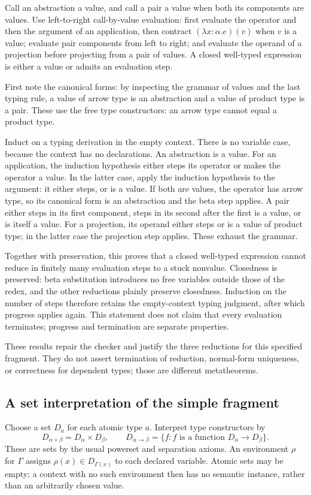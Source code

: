 \begin{theorem}
Call an abstraction a value, and call a pair a value when both its
components are values. Use left-to-right call-by-value evaluation:
first evaluate the operator and then the argument of an application,
then contract $(\lambda x:\alpha.e)(v)$ when $v$ is a value;
evaluate pair components from left to right; and evaluate the operand
of a projection before projecting from a pair of values. A closed
well-typed expression is either a value or admits an evaluation step.
\end{theorem}
\Proof
First note the canonical forms: by inspecting the grammar of values
and the last typing rule, a value of arrow type is an abstraction and
a value of product type is a pair. These use the free type constructors:
an arrow type cannot equal a product type.

Induct on a typing derivation in the empty context. There is no variable
case, because the context has no declarations. An abstraction is a value.
For an application, the induction hypothesis either steps its operator
or makes the operator a value. In the latter case, apply the induction
hypothesis to the argument: it either steps, or is a value. If both are
values, the operator has arrow type, so its canonical form is an
abstraction and the beta step applies. A pair either steps in its first
component, steps in its second after the first is a value, or is itself
a value. For a projection, its operand either steps or is a value of
product type; in the latter case the projection step applies.
These exhaust the grammar.
\Done

Together with preservation, this proves that a closed well-typed
expression cannot reduce in finitely many evaluation steps to a stuck
nonvalue. Closedness is preserved: beta substitution introduces no free
variables outside those of the redex, and the other reductions plainly
preserve closedness. Induction on the number of steps therefore retains
the empty-context typing judgment, after which progress applies again.
This statement does not claim that every evaluation terminates; progress
and termination are separate properties.

These results repair the checker and justify the three reductions for
this specified fragment. They do not assert termination of reduction,
normal-form uniqueness, or correctness for dependent types; those are
different metatheorems.

\subsection{A set interpretation of the simple fragment}
Choose a set $D_a$ for each atomic type $a$. Interpret type constructors by
\[
D_{\alpha\times\beta}=D_\alpha\times D_\beta,
\qquad
D_{\alpha\to\beta}=\{f:f\text{ is a function }D_\alpha\to D_\beta\}.
\]
These are sets by the usual powerset and separation axioms. An environment
$\rho$ for $\Gamma$ assigns $\rho(x)\in D_{\Gamma(x)}$ to each declared
variable. Atomic sets may be empty; a context with no such environment
then has no semantic instance, rather than an arbitrarily chosen value.

